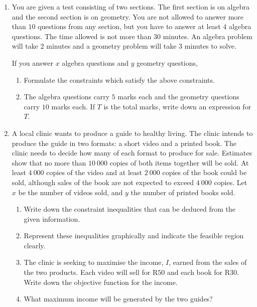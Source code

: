 \begin{eocexercises}{}
\begin{enumerate}

\item{You are given a test consisting of two sections. The first section is on algebra and the second section is on geometry. You are not allowed to answer more than $10$ questions from any section, but you have to answer at least $4$ algebra questions. The time allowed is not more than $30$ minutes. An algebra problem will take $2$ minutes and a geometry problem will take $3$ minutes to solve.

If you answer $x$ algebra questions and $y$ geometry questions,
\begin{enumerate}
\item{Formulate the constraints which satisfy the above constraints.}
\item{The algebra questions carry $5$ marks each and the geometry questions carry $10$ marks each. If $T$ is the total marks, write down an expression for $T$.}
\end{enumerate}}

\item{A local clinic wants to produce a guide to healthy living. The clinic intends to produce the guide in two formats: a short video and a printed book. The clinic needs to decide how many of each format to produce for sale. Estimates show that no more than $10~000$ copies of both items together will be sold. At least $4~000$ copies of the video and at least $2~000$ copies of the book could be sold, although sales of the book are not expected to exceed $4~000$ copies. Let $x$ be the number of videos sold, and $y$ the number of printed books sold.
\begin{enumerate}
\item{Write down the constraint inequalities that can be deduced from the given information.}
\item{Represent these inequalities graphically and indicate the feasible region clearly.}
\item{The clinic is seeking to maximise the income, $I$, earned from the sales of the two products. Each video will sell for R$50$ and each book for R$30$. Write down the objective function for the income.}
\item{What maximum income will be generated by the two guides?}
\end{enumerate}}


\end{enumerate}
\end{eocexercises}

